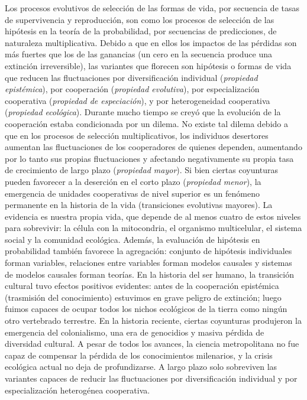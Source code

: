 \documentclass[a4paper,11pt]{book}
\theoremstyle{definition}
\begin{document}
Los procesos evolutivos de selección de las formas de vida, por secuencia de tasas de supervivencia y reproducción, son como los procesos de selección de las hipótesis en la teoría de la probabilidad, por secuencias de predicciones, de naturaleza multiplicativa.
%
Debido a que en ellos los impactos de las pérdidas son más fuertes que los de las ganancias (un cero en la secuencia produce una extinción irreversible), las variantes que florecen son hipótesis o formas de vida que reducen las fluctuaciones por diversificación individual (\emph{propiedad epistémica}), por cooperación (\emph{propiedad evolutiva}), por especialización cooperativa (\emph{propiedad de especiación}), y por heterogeneidad cooperativa (\emph{propiedad ecológica}).
%
Durante mucho tiempo se creyó que la evolución de la cooperación estaba condicionada por un dilema.
%
No existe tal dilema debido a que en los procesos de selección multiplicativos, los individuos desertores aumentan las fluctuaciones de los cooperadores de quienes dependen, aumentando por lo tanto sus propias fluctuaciones y afectando negativamente su propia tasa de crecimiento de largo plazo (\emph{propiedad mayor}).
%
Si bien ciertas coyunturas pueden favorecer a la deserción en el corto plazo (\emph{propiedad menor}), la emergencia de unidades cooperativas de nivel superior es un fenómeno permanente en la historia de la vida (transiciones evolutivas mayores).
%
La evidencia es nuestra propia vida, que depende de al menos cuatro de estos niveles para sobrevivir: la célula con la mitocondria, el organismo multicelular, el sistema social y la comunidad ecológica.
%
Además, la evaluación de hipótesis en probabilidad también favorece la agregación: conjunto de hipótesis individuales forman variables, relaciones entre variables forman modelos causales y sistemas de modelos causales forman teorías.
%
En la historia del ser humano, la transición cultural tuvo efectos positivos evidentes: antes de la cooperación epistémica (trasmisión del conocimiento) estuvimos en grave peligro de extinción; luego fuimos capaces de ocupar todos los nichos ecológicos de la tierra como ningún otro vertebrado terrestre.
%
En la historia reciente, ciertas coyunturas produjeron la emergencia del colonialismo, una era de genocidios y masiva pérdida de diversidad cultural.
%
A pesar de todos los avances, la ciencia metropolitana no fue capaz de compensar la pérdida de los conocimientos milenarios, y la crisis ecológica actual no deja de profundizarse.
%
A largo plazo solo sobreviven las variantes capaces de reducir las fluctuaciones por diversificación individual y por especialización heterogénea cooperativa.
\end{document}
